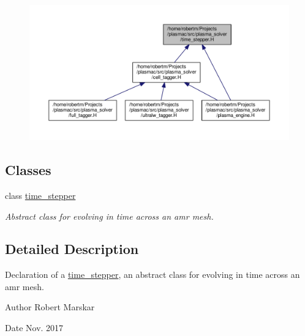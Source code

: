 \begin{figure}[H]
\begin{center}
\leavevmode
\includegraphics[width=350pt]{time__stepper_8H__dep__incl}
\end{center}
\end{figure}
\subsection*{Classes}
\begin{DoxyCompactItemize}
\item 
class \hyperlink{classtime__stepper}{time\+\_\+stepper}
\begin{DoxyCompactList}\small\item\em Abstract class for evolving in time across an amr mesh. \end{DoxyCompactList}\end{DoxyCompactItemize}


\subsection{Detailed Description}
Declaration of a \hyperlink{classtime__stepper}{time\+\_\+stepper}, an abstract class for evolving in time across an amr mesh. 

\begin{DoxyAuthor}{Author}
Robert Marskar 
\end{DoxyAuthor}
\begin{DoxyDate}{Date}
Nov. 2017 
\end{DoxyDate}
